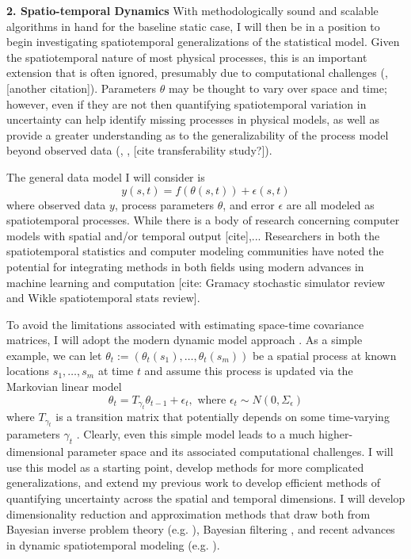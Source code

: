 \documentclass[12pt]{article}
\begin{document}
 \textbf{2. Spatio-temporal Dynamics}
With methodologically sound and scalable algorithms in hand for the baseline static case, I will then be in a position to begin investigating spatiotemporal generalizations of the statistical model. Given the spatiotemporal nature of most physical processes, this is an important extension that is often ignored, presumably due to computational challenges (\cite{Fer2}, [another citation]). Parameters $\theta$ may be thought to vary over space
and time; however, even if they are not then quantifying spatiotemporal variation in uncertainty can help identify 
missing processes in physical models, as well as provide a greater understanding as to the generalizability of the process model beyond observed data (\cite{Fer2}, \cite{Dietze}, [cite transferability study?]). 

The general data model I will consider is 
  \[y(s, t) = f(\theta(s, t)) + \epsilon(s, t)\]
 where observed data $y$, process parameters $\theta$, and error $\epsilon$ are all modeled as spatiotemporal processes. While there is a body of research
 concerning computer models with spatial and/or temporal output [cite],... Researchers in both the spatiotemporal statistics and computer modeling communities
 have noted the potential for integrating methods in both fields using modern advances in machine learning and computation [cite: Gramacy stochastic simulator review and Wikle spatiotemporal stats review].
 
 
 
 To avoid the limitations associated with estimating space-time covariance matrices, I will adopt the modern dynamic model approach \cite{Arab}. As a simple example, 
  we can let $\theta_t := (\theta_t (s_1), \dots, \theta_t (s_m))$ be a spatial process at known locations $s_1, \dots, s_m$ at time $t$ and assume this process is updated
  via the Markovian linear model
  \[\theta_t = T_{\gamma_t} \theta_{t - 1} + \epsilon_t, \text{ where } \epsilon_t \sim N(0, \Sigma_\epsilon)\]
  where $T_{\gamma_t}$ is a transition matrix that potentially depends on some time-varying parameters $\gamma_t$ \cite{Arab}. Clearly, even this simple model leads to a 
  much higher-dimensional parameter space and its associated computational challenges. I will use this model as a starting point, develop methods for more
  complicated generalizations, and extend my previous work to develop efficient methods of quantifying uncertainty across the spatial and temporal dimensions. 
  I will develop dimensionality reduction and approximation methods that draw both from Bayesian inverse problem theory (e.g. \cite{Kugler}), Bayesian filtering \cite{Sarkka},
  and recent advances in dynamic spatiotemporal modeling (e.g. \cite{Hefley}). 
 
\end{document}
